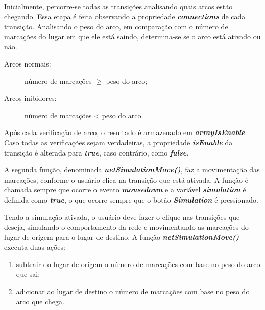 \documentclass[
	12pt,				%
	openright,			%
	oneside,			%
	a4paper,			%
	english,			%
	brazil				%
	]{abntex2}
\theoremstyle{doispontos}
\begin{document}


Inicialmente, percorre-se todas as transições analisando quais arcos estão chegando. Essa etapa é feita observando a propriedade \textbf{\textit{connections}} de cada transição. Analisando o peso do arco, em comparação com o número de marcações do lugar em que ele está saindo, determina-se se o arco está ativado ou não.

\begin{description}
	\item[Arcos normais:] número de marcações $\geq$ peso do arco;
	\item[Arcos inibidores:] número de marcações < peso do arco.
\end{description}

Após cada verificação de arco, o resultado é armazenado em \textbf{\textit{arrayIsEnable}}. Caso todas as verificações sejam verdadeiras, a propriedade \textbf{\textit{isEnable}} da transição é alterada para \textbf{\textit{true}}, caso contrário, como \textbf{\textit{false}}. 

A segunda função, denominada \textbf{\textit{netSimulationMove()}}, faz a movimentação das marcações, conforme o usuário clica na transição que está ativada. A função é chamada sempre que ocorre o evento \textbf{\textit{mousedown}} e a variável \textbf{\textit{simulation}} é definida como \textbf{\textit{true}}, o que ocorre sempre que o botão \textbf{\textit{Simulation}} é pressionado.  



Tendo a simulação ativada, o usuário deve fazer o clique nas transições que deseja, simulando o comportamento da rede e movimentando as marcações do lugar de origem para o lugar de destino. A função \textbf{\textit{netSimulationMove()}} executa duas ações: 

\begin{enumerate}
	\item subtrair do lugar de origem o número de marcações com base no peso do arco que sai;
	\item adicionar ao lugar de destino o número de marcações com base no peso do arco que chega.
\end{enumerate}


\end{document}
